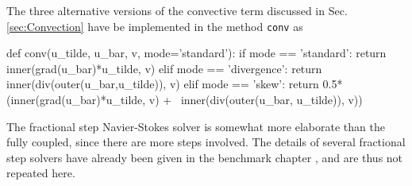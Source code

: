 The three alternative versions of the convective term discussed in Sec. \ref{sec:Convection} have be implemented in the method {\fontsize{12pt}{12pt}\texttt{conv}} as
\begin{python}
def conv(u_tilde, u_bar, v, mode='standard'):
    if mode == 'standard':
        return inner(grad(u_bar)*u_tilde, v)
    elif mode == 'divergence':
        return inner(div(outer(u_bar,u_tilde)), v)
    elif mode == 'skew':
        return 0.5*(inner(grad(u_bar)*u_tilde, v) + \
        inner(div(outer(u_bar, u_tilde)), v))
\end{python}
The fractional step Navier-Stokes solver is somewhat more elaborate
than the fully coupled, since there are more steps involved. The
details of several fractional step solvers have already been given in
the benchmark chapter \cite{nsValen-SendstadLoggMardalEtAl2010}, and are thus not repeated here.

